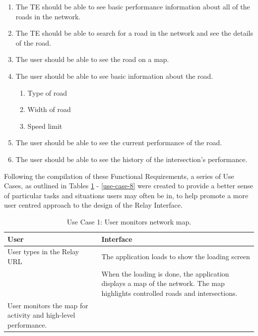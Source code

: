 \documentclass{report}
\begin{document}
\begin{enumerate}
\begin{enumerate}
    \item The TE should be able to see basic performance information about all of the roads in the network.
    \item The TE should be able to search for a road in the network and see the details of the road.
    \item The user should be able to see the road on a map.
    \item The user should be able to see basic information about the road.
    \begin{enumerate}
    	\item Type of road
	\item Width of road
	\item Speed limit
    \end{enumerate}
    \item The user should be able to see the current performance of the road.
    \item The user should be able to see the history of the intersection's performance.
  \end{enumerate}
\end{enumerate}

Following the compilation of these Functional Requirements, a series of Use Cases, as outlined in Tables \ref{use-case-1} - \ref{use-case-8} were created to provide a better sense of particular tasks and situations users may often be in, to help promote a more user centred approach to the design of the Relay Interface.

\begin{table}[htbp]
\begin{centering}
    \begin{tabular}{| p{7cm} | p{7cm} |}
    \hline
    User    & Interface   \\ \hline
    User types in the Relay URL    &     The application loads to show the loading screen    \\ \hline
    ~      & When the loading is done, the application displays a map of the network. The map highlights controlled roads and intersections. \\ \hline
     User monitors the map for activity and high-level performance. & ~          \\ \hline
    \end{tabular}
    \caption {Use Case 1: User monitors network map.}
    \label{use-case-1}
   \end{centering}
\end{table}
\end{document}
